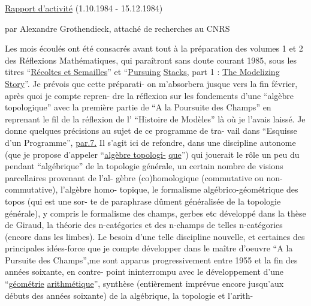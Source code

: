\uline{Rapport d'activité} (1.10.1984 - 15.12.1984)

par Alexandre Grothendieck, attaché de recherches au CNRS

Les mois écoulés ont été consacrés avant tout à la préparation des
volumes 1 et 2 des Réflexions Mathématiques, qui paraîtront sans doute
courant 1985, sous les titres ``\uline{Récoltes et Semailles}'' et ``\uline{Pursuing}
\uline{Stacks,} part 1 : \uline{The Modelizing Story}''. Je prévois que cette préparati-%
on m'absorbera jusque vers la fin février, après quoi je compte repren-%
dre la réflexion sur les fondements d'une ``algèbre topologique''\hand{(}
avec la première partie de ``A la Poursuite des Champs''\hand{)}\unsure{,} en reprenant
le fil de la réflexion de l' ``Histoire de Modèles'' là où je l'avais
laissé. Je donne quelques précisions au sujet de ce programme de tra-%
vail dans ``Esquisse d'un Programme'', \uline{par.7.}\hand{]} Il s'agit ici de refondre,
dans une discipline autonome (que je propose d'appeler ``\uline{algèbre topologi-}%
\uline{que}'') qui jouerait le rôle un peu du pendant ``algébrique'' de la topologie
générale, un certain nombre de visions parcellaires provenant de l'al-%
gèbre (co)homologique (commutative ou non-commutative), l'algèbre homo-%
topique, le formalisme algébrico-géométrique des topos (qui est une sor-%
te de paraphrase dûment généralisée de la topologie générale), y compris
le formalisme des champs, gerbes etc développé dans la thèse de Giraud,
 la théorie des n-catégories\hand{,} et  des n-champs de telles n-catégories
(encore dans les limbes). Le besoin d'une telle discipline nouvelle,
et certaines des principales idées-force que je compte développer dans
 le maître d'oeuvre ``A la Pursuite des Champs'',me sont apparus
progressivement entre 1955 et la fin des années soixante, en contre-%
point  ininterrompu avec le développement d'une ``\uline{géométrie}
\uline{arithmétique}'', synthèse (entièrement imprévue encore jusqu'aux débuts
des années soixante) de la  algébrique,  la topologie et  l'arith-%
